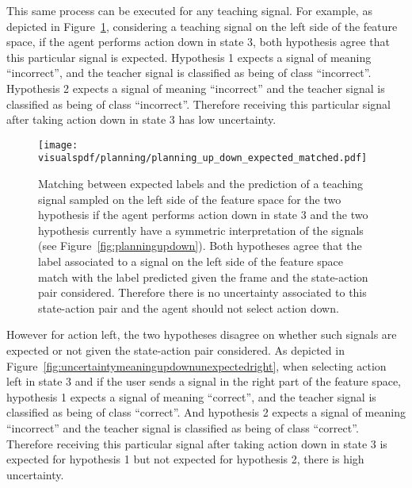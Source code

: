 \visuopti{\newpage}

This same process can be executed for any teaching signal. For example, as depicted in Figure~\ref{fig:uncertaintymeaningupdownexpectedleft}, considering a teaching signal on the left side of the feature space, if the agent performs action down in state 3, both hypothesis agree that this particular signal is expected. Hypothesis 1 expects a signal of meaning ``incorrect'', and the teacher signal is classified as being of class ``incorrect''. Hypothesis 2 expects a signal of meaning ``incorrect'' and the teacher signal is classified as being of class ``incorrect''. Therefore receiving this particular signal after taking action down in state 3 has low uncertainty.

\begin{figure}[H]
  \centering
  \texttt{[image: \\visualspdf/planning/planning\_up\_down\_expected\_matched.pdf]}
  \caption{Matching between expected labels and the prediction of a teaching signal sampled on the left side of the feature space for the two hypothesis if the agent performs action down in state 3 and the two hypothesis currently have a symmetric interpretation of the signals (see Figure~\ref{fig:planningupdown}). Both hypotheses agree that the label associated to a signal on the left side of the feature space match with the label predicted given the frame and the state-action pair considered. Therefore there is no uncertainty associated to this state-action pair and the agent should not select action down.}
  \label{fig:uncertaintymeaningupdownexpectedleft}
\end{figure}

\visuopti{\newpage}

However for action left, the two hypotheses disagree on whether such signals are expected or not given the state-action pair considered. As depicted in Figure~\ref{fig:uncertaintymeaningupdownunexpectedright}, when selecting action left in state 3 and if the user sends a signal in the right part of the feature space, hypothesis 1 expects a signal of meaning ``correct'', and the teacher signal is classified as being of class ``correct''. And hypothesis 2 expects a signal of meaning ``incorrect'' and the teacher signal is classified as being of class ``correct''. Therefore receiving this particular signal after taking action down in state 3 is expected for hypothesis 1 but not expected for hypothesis 2, there is high uncertainty.

